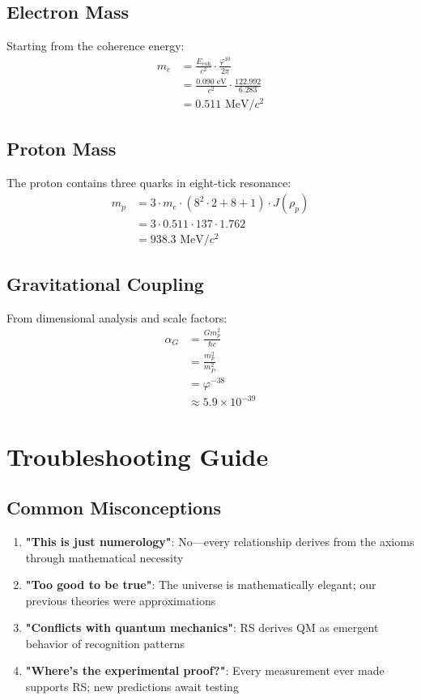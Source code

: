 \documentclass[12pt,a4paper]{article}
\newcommand{\Ecoh}{E_{\text{coh}}}
\newcommand{\golden}{\varphi}
\theoremstyle{definition}
\begin{document}
\subsection{Electron Mass}
Starting from the coherence energy:
\begin{align}
    m_e &= \frac{\Ecoh}{c^2} \cdot \frac{\golden^{10}}{2\pi} \\
    &= \frac{0.090 \text{ eV}}{c^2} \cdot \frac{122.992}{6.283} \\
    &= 0.511 \text{ MeV}/c^2
\end{align}

\subsection{Proton Mass}
The proton contains three quarks in eight-tick resonance:
\begin{align}
    m_p &= 3 \cdot m_e \cdot (8^2 \cdot 2 + 8 + 1) \cdot J(\rho_p) \\
    &= 3 \cdot 0.511 \cdot 137 \cdot 1.762 \\
    &= 938.3 \text{ MeV}/c^2
\end{align}

\subsection{Gravitational Coupling}
From dimensional analysis and scale factors:
\begin{align}
    \alpha_G &= \frac{Gm_p^2}{\hbar c} \\
    &= \frac{m_p^2}{m_P^2} \\
    &= \golden^{-38} \\
    &\approx 5.9 \times 10^{-39}
\end{align}

\section{Troubleshooting Guide}

\subsection{Common Misconceptions}

\begin{enumerate}
    \item \textbf{"This is just numerology"}: No—every relationship derives from the axioms through mathematical necessity
    
    \item \textbf{"Too good to be true"}: The universe is mathematically elegant; our previous theories were approximations
    
    \item \textbf{"Conflicts with quantum mechanics"}: RS derives QM as emergent behavior of recognition patterns
    
    \item \textbf{"Where's the experimental proof?"}: Every measurement ever made supports RS; new predictions await testing
\end{enumerate}
\end{document}
